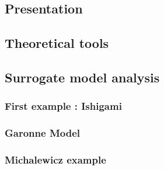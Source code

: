 \documentclass[hidelinks,12pt]{article}
\begin{document}
\subsection{Presentation}
\subsection{Theoretical tools}
\subsection{Surrogate model analysis}
\subsubsection{First example : Ishigami}
\subsubsection{Garonne Model }



\subsubsection{Michalewicz example}






\end{document}
